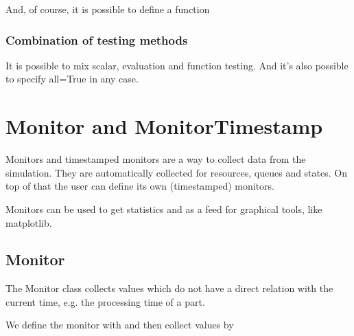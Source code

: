 \documentclass[letterpaper,10pt,english]{sphinxmanual}
\begin{document}
And, of course, it is possible to define a function

\begin{sphinxVerbatim}[commandchars=\\\{\}]
 
        
       


  
  
\end{sphinxVerbatim}


\subsection{Combination of testing methods}
\label{\detokenize{State:combination-of-testing-methods}}
It is possible to mix scalar, evaluation and function testing. And it’s also possible to specify all=True
in any case.


\chapter{Monitor and MonitorTimestamp}
\label{\detokenize{Monitor and MonitorTimestamp:monitor-and-monitortimestamp}}\label{\detokenize{Monitor and MonitorTimestamp::doc}}
Monitors and timestamped monitors are a way to collect data from the simulation. They are automatically collected
for resources, queues and states. On top of that the user can define its own (timestamped) monitors.

Monitors can be used to get statistics and as a feed for graphical tools, like matplotlib.


\section{Monitor}
\label{\detokenize{Monitor and MonitorTimestamp:monitor}}
The Monitor class collects values which do not have a direct relation with the current time,
e.g. the processing time of a part.

We define the monitor with  and then
collect values by 
\end{document}
